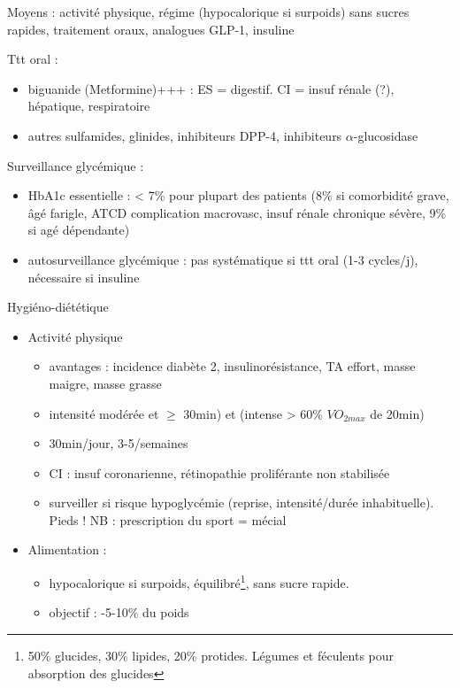 \documentclass[11pt]{article}
\begin{document}
Moyens  : activité physique, régime (hypocalorique si surpoids) sans sucres
rapides, traitement oraux, analogues GLP-1, insuline

Ttt oral :
\begin{itemize}
\item biguanide (Metformine)+++ : ES = digestif. CI = insuf rénale (?), hépatique, respiratoire
\item autres sulfamides, glinides, inhibiteurs DPP-4, inhibiteurs \(\alpha\)-glucosidase
\end{itemize}

Surveillance glycémique :
\begin{itemize}
\item HbA1c essentielle : < 7\% pour plupart des patients (8\% si comorbidité grave,
âgé farigle, ATCD complication macrovasc, insuf rénale chronique sévère, 9\% si
agé dépendante)
\item autosurveillance glycémique : pas systématique si ttt oral (1-3 cycles/j),
nécessaire si insuline
\end{itemize}

Hygiéno-diététique
\begin{itemize}
\item Activité physique 
\begin{itemize}
\item avantages : \dec incidence diabète 2, \inc insulinorésistance, \inc TA
effort, \inc masse maigre, \dec masse grasse
\item intensité modérée et \(\ge\) 30min) et (intense > 60\% \(VO_{2max}\) de 20min)
\item 30min/jour, 3-5/semaines
\item CI : insuf coronarienne, rétinopathie proliférante non stabilisée
\item surveiller si risque hypoglycémie (reprise, intensité/durée
inhabituelle). Pieds ! NB : prescription du sport = mécial
\end{itemize}
\item Alimentation : 
\begin{itemize}
\item hypocalorique si surpoids, équilibré\footnote{50\% glucides, 30\% lipides, 20\% protides. Légumes et féculents pour \inc
absorption des glucides}, sans sucre rapide.
\item objectif : -5-10\% du poids
\end{itemize}
\end{itemize}
\end{document}
